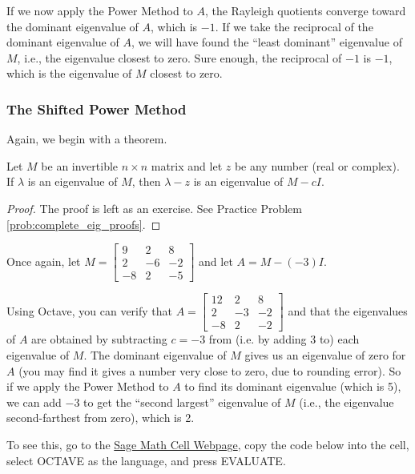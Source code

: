 \documentclass{ximera}
\begin{document}
If we now apply the Power Method to $A$, the Rayleigh quotients converge toward the dominant eigenvalue of $A$, which is $-1$.  If we take the reciprocal of the dominant eigenvalue of $A$, we will have found the ``least dominant'' eigenvalue of $M$, i.e., the eigenvalue closest to zero.  Sure enough, the reciprocal of $-1$ is $-1$, which is the eigenvalue of $M$ closest to zero.


\subsubsection*{The Shifted Power Method}
Again, we begin with a theorem.

\begin{theorem}\label{th:eig_shifted}
Let $M$ be an invertible $n \times n$ matrix and let $z$ be any number (real or complex).  If $\lambda$ is an eigenvalue of $M$, then $\lambda - z$ is an eigenvalue of $M - cI$.
\end{theorem}

\begin{proof}
The proof is left as an exercise.  See Practice Problem \ref{prob:complete_eig_proofs}.
\end{proof}

Once again, let $M=\left[ \begin{array}{rrr}
9 & 2 & 8 \\
2 & -6 & -2 \\
-8 & 2 & -5
\end{array}\right]$ and let $A=M - (-3)I$.

Using Octave, you can verify that $A=\left[ \begin{array}{rrr}
12 & 2 & 8 \\
2 & -3 & -2 \\
-8 & 2 & -2
\end{array}\right]$ and that the eigenvalues of $A$ are obtained by subtracting $c=-3$ from (i.e. by adding 3 to) each eigenvalue of $M$.  The dominant eigenvalue of $M$ gives us an eigenvalue of zero for $A$ (you may find it gives a number very close to zero, due to rounding error).  So if we apply the Power Method to $A$ to find its dominant eigenvalue (which is 5), we can add $-3$ to get the ``second largest'' eigenvalue of $M$ (i.e., the eigenvalue second-farthest from zero), which is 2.

To see this, go to the \href{https://sagecell.sagemath.org/}{Sage Math Cell Webpage}, copy the code below into the cell, select OCTAVE as the language, and press EVALUATE.
\end{document}
